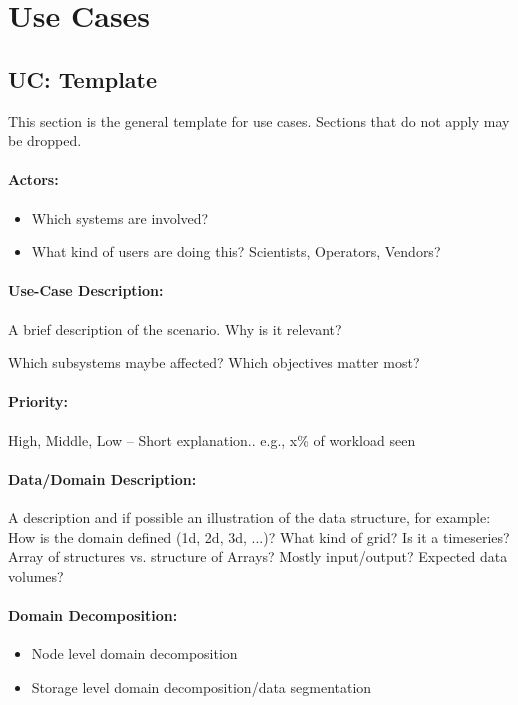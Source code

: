 \section{Use Cases}

\subsection{UC: Template}

This section is the general template for use cases.
Sections that do not apply may be dropped.

\paragraph{Actors:}
\begin{itemize}
	\item Which systems are involved?
	\item What kind of users are doing this? Scientists, Operators, Vendors?
\end{itemize}

\paragraph{Use-Case Description:}
A brief description of the scenario.
Why is it relevant?

Which subsystems maybe affected?
Which objectives matter most?

\paragraph{Priority:}
High, Middle, Low -- Short explanation.. e.g., x\% of workload seen


\paragraph{Data/Domain Description:}
A description and if possible an illustration of the data structure, for example:
How is the domain defined (1d, 2d, 3d, ...)?
What kind of grid?
Is it a timeseries?
Array of structures vs. structure of Arrays?
Mostly input/output?
Expected data volumes?

\paragraph{Domain Decomposition:}
\begin{itemize}
	\item Node level domain decomposition
	\item Storage level domain decomposition/data segmentation
\end{itemize}

